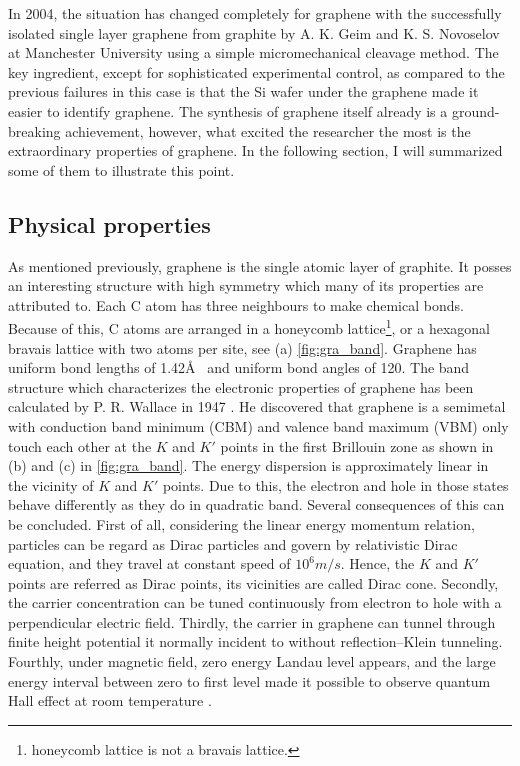 In 2004, the situation has changed completely for graphene with the successfully isolated single layer graphene from graphite by A. K. Geim and K. S. Novoselov at Manchester University using a simple micromechanical cleavage method. The key ingredient, except for sophisticated experimental control, as compared to the previous failures\cite{Krishnan1997,Ohashi1997} in this case is that the Si wafer under the graphene made it easier to identify graphene\cite{Geim2007}. The synthesis of graphene itself already is a ground-breaking achievement, however, what excited the researcher the most is the extraordinary properties of graphene. In the following section, I will summarized some of them to illustrate this point.

\subsection{Physical properties}

As mentioned previously, graphene is the single atomic layer of graphite. It posses an interesting structure with high symmetry which many of its properties are attributed to. Each C atom has three neighbours to make chemical bonds. Because of this, C atoms are arranged in a honeycomb lattice\footnote{honeycomb lattice is not a bravais lattice.}, or a hexagonal bravais lattice with two atoms per site, see (a) \autoref{fig:gra_band}. Graphene has uniform bond lengths of 1.42\AA~ and uniform bond angles of 120\textdegree. The band structure which characterizes the electronic properties of graphene has been calculated by P. R. Wallace in 1947 \cite{Wallace1947}. He discovered that graphene is a semimetal with conduction band minimum (CBM) and valence band maximum (VBM) only touch each other at the $K$ and $K'$ points in the first Brillouin zone as shown in (b) and (c) in \autoref{fig:gra_band}. The energy dispersion is approximately linear in the vicinity of $K$ and $K'$ points. Due to this, the electron and hole in those states behave differently as they do in quadratic band. Several consequences of this can be concluded. First of all, considering the linear energy momentum relation, particles can be regard as Dirac particles and govern by relativistic Dirac equation\cite{Novoselov2005}, and they travel at constant speed of $10^6m/s$. Hence, the $K$ and $K'$ points are referred as Dirac points, its vicinities are called Dirac cone. Secondly, the carrier concentration can be tuned continuously from electron to hole with a perpendicular electric field\cite{Geim2007}. Thirdly, the carrier in graphene can tunnel through finite height potential it normally incident to without reflection--Klein tunneling\cite{Katsnelson2006}. Fourthly, under magnetic field, zero energy Landau level appears, and the large energy interval between zero to first level made it possible to observe quantum Hall effect at room temperature \cite{Novoselov1379}. 

